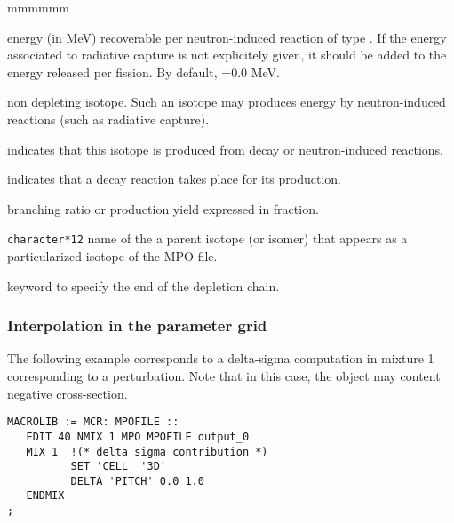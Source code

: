 \begin{ListeDeDescription}{mmmmmm}
\item[\dusa{energy}] energy (in MeV) recoverable per neutron-induced
reaction of type . If the energy associated to radiative capture
is not explicitely given, it should be added to the energy released per fission. By
default, =0.0 MeV.

\item[\moc{STABLE}] non depleting isotope. Such an isotope may produces
energy by neutron-induced reactions (such as radiative capture).

\item[\moc{FROM}] indicates that this isotope is produced from decay or
neutron-induced reactions.

\item[\moc{DECAY}] indicates that a decay reaction takes place for its
production.

\item[\dusa{yield}] branching ratio or production yield expressed in fraction.

\item[\dusa{NAMPAR}] {\tt character*12} name of the a parent isotope
(or isomer) that appears as a particularized isotope of the MPO file.

\item[\moc{ENDCHAIN}] keyword to specify the end of the depletion chain.

\end{ListeDeDescription}

\subsubsection{Interpolation in the parameter grid}

The following example corresponds to a delta-sigma computation in mixture 1 corresponding to a perturbation. Note that in this case, the  object may content negative cross-section. 
\begin{verbatim}
MACROLIB := MCR: MPOFILE ::
   EDIT 40 NMIX 1 MPO MPOFILE output_0
   MIX 1  !(* delta sigma contribution *)
          SET 'CELL' '3D'
          DELTA 'PITCH' 0.0 1.0
   ENDMIX
;
\end{verbatim}

\clearpage
